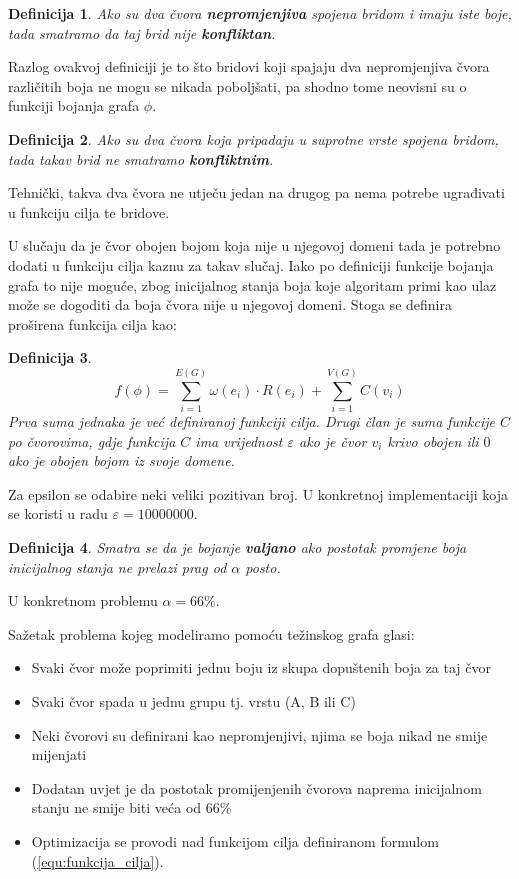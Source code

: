 \documentclass[times, utf8, diplomski, numeric]{fer}
\newtheorem{definition}{Definicija}
\begin{document}
\begin{definition}
Ako su dva čvora \textbf{nepromjenjiva} spojena bridom i imaju iste boje, tada smatramo da taj brid nije \textbf{konfliktan}.
\end{definition}

Razlog ovakvoj definiciji je to što bridovi koji spajaju dva nepromjenjiva čvora različitih boja ne mogu se nikada poboljšati, pa shodno tome neovisni su o funkciji bojanja grafa $\phi$.

\begin{definition}
Ako su dva čvora koja pripadaju u suprotne vrste spojena bridom, tada takav brid ne smatramo \textbf{konfliktnim}.
\end{definition}

Tehnički, takva dva čvora ne utječu jedan na drugog pa nema potrebe  ugrađivati u funkciju cilja te bridove.

U slučaju da je čvor obojen bojom koja nije u njegovoj domeni tada je potrebno dodati u funkciju cilja kaznu za takav slučaj. Iako po definiciji funkcije bojanja grafa to nije moguće, zbog inicijalnog stanja boja koje algoritam primi kao ulaz može se dogoditi da boja čvora nije u njegovoj domeni. Stoga se definira proširena funkcija cilja kao:

\begin{definition}
\begin{equation}
\label{equ:funkcija_cilja}
f(\phi) = \sum_{i=1}^{E(G)} \omega(e_i) \cdot R(e_i) + \sum_{i=1}^{V(G)} C(v_i)
\end{equation}
Prva suma jednaka je već definiranoj funkciji cilja. Drugi član je suma funkcije $C$ po čvorovima, gdje funkcija $C$ ima vrijednost $\varepsilon$ ako je čvor $v_i$ krivo obojen ili $0$ ako je obojen bojom iz svoje domene.
\end{definition}

Za epsilon se odabire neki veliki pozitivan broj. U konkretnoj implementaciji koja se koristi u radu $\varepsilon=10000000$.

\begin{definition}
Smatra se da je bojanje \textbf{valjano} ako postotak promjene boja inicijalnog stanja ne prelazi prag od $\alpha$ posto.
\end{definition}

U konkretnom problemu $\alpha=66\%$.

Sažetak problema kojeg modeliramo pomoću težinskog grafa glasi:
\begin{itemize}
	\item Svaki čvor može poprimiti jednu boju iz skupa dopuštenih boja za taj čvor
	\item Svaki čvor spada u jednu grupu tj. vrstu (A, B ili C)
	\item Neki čvorovi su definirani kao nepromjenjivi, njima se boja nikad ne smije mijenjati
	\item Dodatan uvjet je da postotak promijenjenih čvorova naprema inicijalnom stanju ne smije biti veća od 66\%
	\item Optimizacija se provodi nad funkcijom cilja definiranom formulom (\ref{equ:funkcija_cilja}).
\end{itemize}
\end{document}
